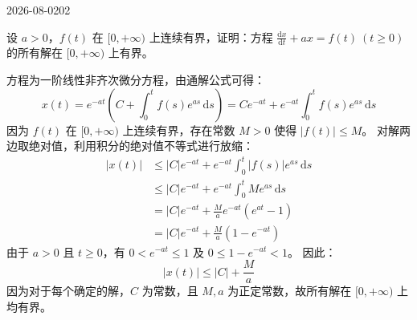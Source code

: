 \begin{mistake}{2026-08-02}{02}

\begin{problemcontent}
设 \(a>0\)，\(f(t)\) 在 \([0, +\infty)\) 上连续有界，证明：方程 \(\frac{\text{d}x}{\text{d}t} + ax = f(t)\ (t \ge 0)\) 的所有解在 \([0, +\infty)\) 上有界。
\end{problemcontent}

\begin{solutioncontent}
方程为一阶线性非齐次微分方程，由通解公式可得：
\[x(t) = e^{-at} \left( C + \int_0^t f(s) e^{as} \, \text{d}s \right) = C e^{-at} + e^{-at} \int_0^t f(s) e^{as} \, \text{d}s\]
因为 \(f(t)\) 在 \([0, +\infty)\) 上连续有界，存在常数 \(M > 0\) 使得 \(|f(t)| \le M\)。
对解两边取绝对值，利用积分的绝对值不等式进行放缩：
\[\begin{aligned}
|x(t)| &\le |C| e^{-at} + e^{-at} \int_0^t |f(s)| e^{as} \, \text{d}s \\
&\le |C| e^{-at} + e^{-at} \int_0^t M e^{as} \, \text{d}s \\
&= |C| e^{-at} + \frac{M}{a} e^{-at} (e^{at} - 1) \\
&= |C| e^{-at} + \frac{M}{a} (1 - e^{-at})
\end{aligned}\]
由于 \(a > 0\) 且 \(t \ge 0\)，有 \(0 < e^{-at} \le 1\) 及 \(0 \le 1 - e^{-at} < 1\)。
因此：
\[|x(t)| \le |C| + \frac{M}{a}\]
因为对于每个确定的解，\(C\) 为常数，且 \(M, a\) 为正定常数，故所有解在 \([0, +\infty)\) 上均有界。
\end{solutioncontent}


\end{mistake}
